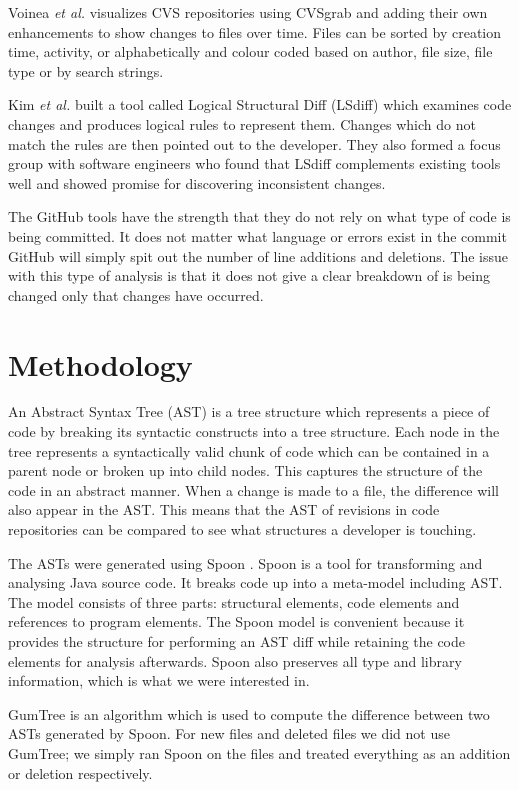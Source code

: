 \documentclass[conference]{IEEEtran}
\begin{document}
Voinea \textit{et al.} \cite{voinea2006} visualizes CVS repositories using CVSgrab and adding their own enhancements to show changes to files over time. Files can be sorted by creation time, activity, or alphabetically and colour coded based on author, file size, file type or by search strings.

Kim \textit{et al.} \cite{Kim:2009:DRS:1555001.1555046} built a tool called Logical Structural Diff (LSdiff) which examines code changes and produces logical rules to represent them. Changes which do not match the rules are then pointed out to the developer. They also formed a focus group with software engineers who found that LSdiff complements existing tools well and showed promise for discovering inconsistent changes.

The GitHub tools have the strength that they do not rely on what type of code is being committed. It does not matter what language or errors exist in the commit GitHub will simply spit out the number of line additions and deletions. The issue with this type of analysis is that it does not give a clear breakdown of is being changed only that changes have occurred.

\section{Methodology}

An Abstract Syntax Tree (AST) is a tree structure which represents a piece of code by breaking its syntactic constructs into a tree structure. Each node in the tree represents a syntactically valid chunk of code which can be contained in a parent node or broken up into child nodes. This captures the structure of the code in an abstract manner. When a change is made to a file, the difference will also appear in the AST. This means that the AST of revisions in code repositories can be compared to see what structures a developer is touching. 

The ASTs were generated using Spoon \cite{pawlak:hal-01169705}. Spoon is a tool for transforming and analysing Java source code. It breaks code up into a meta-model including AST. The model consists of three parts: structural elements, code elements and references to program elements. The Spoon model is convenient because it provides the structure for performing an AST diff while retaining the code elements for analysis afterwards. Spoon also preserves all type and library information, which is what we were interested in.

GumTree \cite{falleri:hal-01054552} is an algorithm which is used to compute the difference between two ASTs generated by Spoon. For new files and deleted files we did not use GumTree; we simply ran Spoon on the files and treated everything as an addition or deletion respectively.
\end{document}
